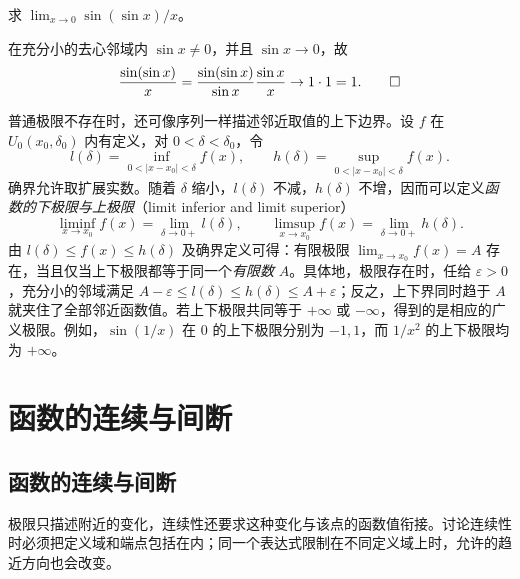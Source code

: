 \begin{example}
\label{ex:fundamental-trigonometric-limit-use}
求 $\lim_{x\to0}\sin(\sin x)/x$。
\end{example}

\begin{solve}
在充分小的去心邻域内 $\sin x\neq0$，并且 $\sin x\to0$，故
\[
    \frac{\sin(\sin x)}x
    =\frac{\sin(\sin x)}{\sin x}\frac{\sin x}x\to1\cdot1=1.
    \qedhere
\]
\end{solve}

普通极限不存在时，还可像序列一样描述邻近取值的上下边界。设 $f$ 在 $U_0(x_0,\delta_0)$ 内有定义，对 $0<\delta<\delta_0$，令
\[
    l(\delta)=\inf_{0<|x-x_0|<\delta}f(x),
    \qquad h(\delta)=\sup_{0<|x-x_0|<\delta}f(x).
\]
确界允许取扩展实数。随着 $\delta$ 缩小，$l(\delta)$ 不减，$h(\delta)$ 不增，因而可以定义\emph{函数的下极限与上极限}（limit inferior and limit superior）
\begin{equation}
    \liminf_{x\to x_0}f(x)=\lim_{\delta\to0+}l(\delta),
    \qquad
    \limsup_{x\to x_0}f(x)=\lim_{\delta\to0+}h(\delta).
    \label{eq:function-liminf-limsup}
\end{equation}
由 $l(\delta)\leq f(x)\leq h(\delta)$ 及确界定义可得：有限极限 $\lim_{x\to x_0}f(x)=A$ 存在，当且仅当上下极限都等于同一个\emph{有限数} $A$。具体地，极限存在时，任给 $\varepsilon>0$，充分小的邻域满足 $A-\varepsilon\leq l(\delta)\leq h(\delta)\leq A+\varepsilon$；反之，上下界同时趋于 $A$ 就夹住了全部邻近函数值。若上下极限共同等于 $+\infty$ 或 $-\infty$，得到的是相应的广义极限。例如，$\sin(1/x)$ 在 $0$ 的上下极限分别为 $-1,1$，而 $1/x^2$ 的上下极限均为 $+\infty$。

\section{函数的连续与间断}
\label{sec:continuity-and-discontinuity}

\subsection{函数的连续与间断}
\label{subsec:continuity-and-discontinuity}

极限只描述附近的变化，连续性还要求这种变化与该点的函数值衔接。讨论连续性时必须把定义域和端点包括在内；同一个表达式限制在不同定义域上时，允许的趋近方向也会改变。

